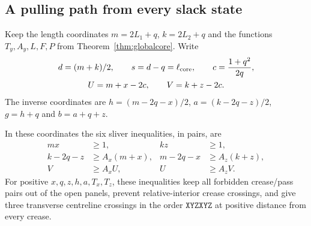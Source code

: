 \subsection{A pulling path from every slack state}\label{sec:slackreach}

Keep the length coordinates $m=2L_1+q$, $k=2L_2+q$ and the functions $T_y,A_y,L,F,P$ from Theorem~\ref{thm:globalcore}. Write
\[
\begin{gathered}
 d=(m+k)/2,\qquad s=d-q=\ell_{\mathrm{core}},\qquad c=\frac{1+q^2}{2q},\\
 U=m+x-2c,\qquad V=k+z-2c.
\end{gathered}
\]
The inverse coordinates are $h=(m-2q-x)/2$, $a=(k-2q-z)/2$, $g=h+q$ and $b=a+q+z$.

\begin{lemma}\label{lem:reachgeometry}
In these coordinates the six sliver inequalities, in pairs, are
\begin{equation}\label{eq:reachwalls}
\begin{aligned}
 mx&\ge1, & kz&\ge1,\\
 k-2q-z&\ge A_x(m+x), & m-2q-x&\ge A_z(k+z),\\
 V&\ge A_xU, & U&\ge A_zV .
\end{aligned}
\end{equation}
For positive $x,q,z,h,a,T_x,T_z$, these inequalities keep all forbidden crease/pass pairs out of the open panels, prevent relative-interior crease crossings, and give three transverse centreline crossings in the order $\mathtt{XYZXYZ}$ at positive distance from every crease.
\end{lemma}

